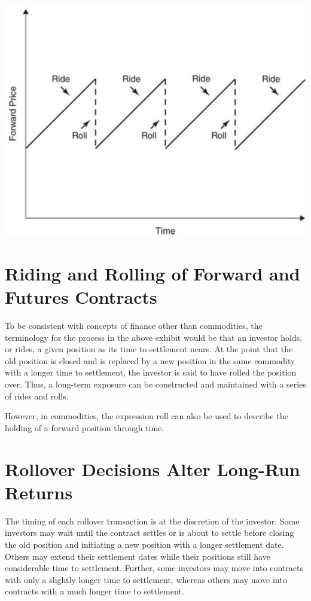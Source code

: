 \documentclass[11pt]{article}
\begin{document}
\begin{center}
\includegraphics[max width=\textwidth]{2024_04_11_59506125c1e82061598cg-2}
\end{center}

\section*{Riding and Rolling of Forward and Futures Contracts}
To be consistent with concepts of finance other than commodities, the terminology for the process in the above exhibit would be that an investor holds, or rides, a given position as its time to settlement nears. At the point that the old position is closed and is replaced by a new position in the same commodity with a longer time to settlement, the investor is said to have rolled the position over. Thus, a long-term exposure can be constructed and maintained with a series of rides and rolls.

However, in commodities, the expression roll can also be used to describe the holding of a forward position through time.

\section*{Rollover Decisions Alter Long-Run Returns}
The timing of each rollover transaction is at the discretion of the investor. Some investors may wait until the contract settles or is about to settle before closing the old position and initiating a new position with a longer settlement date. Others may extend their settlement dates while their positions still have considerable time to settlement. Further, some investors may move into contracts with only a slightly longer time to settlement, whereas others may move into contracts with a much longer time to settlement.
\end{document}
